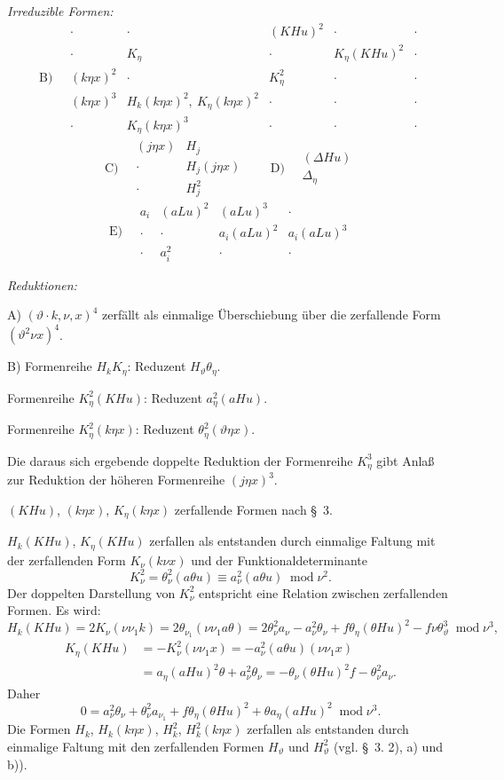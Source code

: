 \documentclass[11pt]{article}
\newcommand{\A}{\Delta}
\newcommand{\modu}[1]{\;\operatorname{mod} #1}
\begin{document}
\noindent\emph{Irreduzible Formen:}
\[
\text{B)}\quad
\begin{array}{c|c|c|c|c}
\cdot&\cdot&(KHu)^2&\cdot&\cdot\\
\cdot&K_\eta&\cdot&K_\eta(KHu)^2&\cdot\\
(k\eta x)^2&\cdot&K_\eta^2&\cdot&\cdot\\
(k\eta x)^3&H_k(k\eta x)^2,\ K_\eta(k\eta x)^2&\cdot&\cdot&\cdot\\
\cdot&K_\eta(k\eta x)^3&\cdot&\cdot&\cdot
\end{array}
\]
\[
\text{C)}\quad
\begin{array}{cc}
(j\eta x)&H_j\\
\cdot&H_j(j\eta x)\\
\cdot&H_j^2
\end{array}
\qquad
\text{D)}\quad
\begin{array}{c}
(\A Hu)\\\A_\eta
\end{array}
\]
\[
\text{E)}\quad
\begin{array}{cccc}
a_i&(aLu)^2&(aLu)^3&\cdot\\
\cdot&\cdot&a_i(aLu)^2&a_i(aLu)^3\\
\cdot&a_i^2&\cdot&\cdot
\end{array}
\]

\noindent\emph{Reduktionen:}

\noindent A) $(\vartheta\cdot k,\nu,x)^4$ zerfällt als einmalige Überschiebung über die zerfallende Form $(\vartheta^2\nu x)^4$.

\noindent B) Formenreihe $H_kK_\eta$: Reduzent $H_\vartheta\theta_\eta$.

Formenreihe $K_\eta^2(KHu)$: Reduzent $a_\eta^2(aHu)$.

Formenreihe $K_\eta^2(k\eta x)$: Reduzent $\theta_\eta^2(\vartheta\eta x)$.

Die daraus sich ergebende doppelte Reduktion der Formenreihe $K_\eta^3$ gibt Anlaß zur Reduktion der höheren Formenreihe $(j\eta x)^3$.

$(KHu)$, $(k\eta x)$, $K_\eta(k\eta x)$ zerfallende Formen nach \S\ 3.

$H_k(KHu)$, $K_\eta(KHu)$ zerfallen als entstanden durch einmalige Faltung mit der zerfallenden Form $K_\nu(k\nu x)$ und der Funktionaldeterminante
\[
K_\nu^2=\theta_\nu^2(a\theta u)\equiv a_\nu^2(a\theta u)\modu{\nu^2}.
\]
Der doppelten Darstellung von $K_\nu^2$ entspricht eine Relation zwischen zerfallenden Formen. Es wird:
\[
H_k(KHu)=2K_\nu(\nu\nu_1k)=2\theta_{\nu_1}(\nu\nu_1a\theta)
=2\theta_\nu^2a_\nu-a_\nu^2\theta_\nu+f\theta_\eta(\theta Hu)^2-f\nu\theta_\vartheta^3
\modu{\nu^3},
\]
\[
\begin{aligned}
K_\eta(KHu)&=-K_\nu^2(\nu\nu_1x)
=-a_\nu^2(a\theta u)(\nu\nu_1x)\\
&=a_\eta(aHu)^2\theta+a_\nu^2\theta_\nu
=-\theta_\nu(\theta Hu)^2f-\theta_\nu^2a_\nu.
\end{aligned}
\]
Daher
\[
\tag{17}
0=a_\nu^2\theta_\nu+\theta_\nu^2a_{\nu_1}+f\theta_\eta(\theta Hu)^2+\theta a_\eta(aHu)^2\modu{\nu^3}.
\]
Die Formen $H_k$, $H_k(k\eta x)$, $H_k^2$, $H_k^2(k\eta x)$ zerfallen als entstanden durch einmalige Faltung mit den zerfallenden Formen $H_\vartheta$ und $H_\vartheta^2$ (vgl. \S\ 3. 2), a) und b)).
\end{document}
